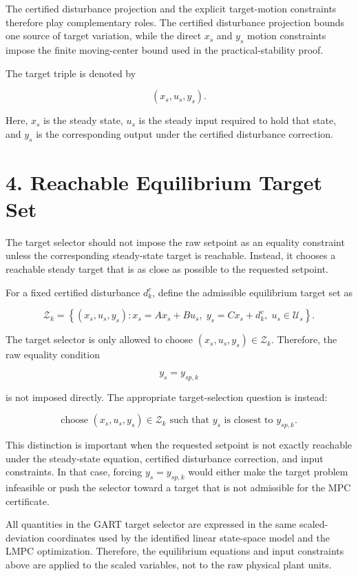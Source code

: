 \documentclass[11pt]{article}
\begin{document}
The certified disturbance projection and the explicit target-motion constraints therefore play complementary roles. The certified disturbance projection bounds one source of target variation, while the direct $x_s$ and $y_s$ motion constraints impose the finite moving-center bound used in the practical-stability proof.


The target triple is denoted by


\[
(x_s,u_s,y_s).
\]

Here, $x_s$ is the steady state, $u_s$ is the steady input required to hold that state, and $y_s$ is the corresponding output under the certified disturbance correction.


\section*{4. Reachable Equilibrium Target Set}

The target selector should not impose the raw setpoint as an equality constraint unless the corresponding steady-state target is reachable. Instead, it chooses a reachable steady target that is as close as possible to the requested setpoint.


For a fixed certified disturbance $d^c_k$, define the admissible equilibrium target set as


\[
\mathcal Z_k
=
\left\{
(x_s,u_s,y_s):
x_s=A x_s+B u_s,\;
y_s=Cx_s+d^c_k,\;
u_s\in\mathcal U_s
\right\}.
\]

The target selector is only allowed to choose $(x_s,u_s,y_s)\in\mathcal Z_k$. Therefore, the raw equality condition


\[
y_s = y_{sp,k}
\]

is not imposed directly. The appropriate target-selection question is instead:


\[
\text{choose }(x_s,u_s,y_s)\in\mathcal Z_k
\text{ such that }y_s\text{ is closest to }y_{sp,k}.
\]

This distinction is important when the requested setpoint is not exactly reachable under the steady-state equation, certified disturbance correction, and input constraints. In that case, forcing $y_s=y_{sp,k}$ would either make the target problem infeasible or push the selector toward a target that is not admissible for the MPC certificate.


All quantities in the GART target selector are expressed in the same scaled-deviation coordinates used by the identified linear state-space model and the LMPC optimization. Therefore, the equilibrium equations and input constraints above are applied to the scaled variables, not to the raw physical plant units.
\end{document}

